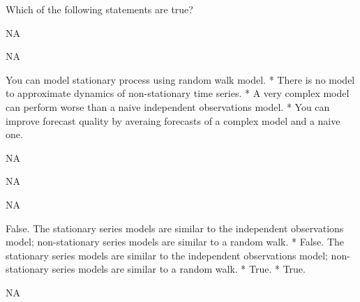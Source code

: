 
\begin{question}
Which of the following statements are true?
\begin{answerlist}
  \item NA
  \item NA
  \item You can model stationary process using random walk model. * There is no model to approximate dynamics of non-stationary time series. * A very complex model can perform worse than a naive independent observations model. * You can improve forecast quality by averaing forecasts of a complex model and a naive one.
  \item NA
\end{answerlist}
\end{question}

\begin{solution}
\begin{answerlist}
  \item NA
  \item NA
  \item False. The stationary series models are similar to the independent observations model; non-stationary series models are similar to a random walk. * False. The stationary series models are similar to the independent observations model; non-stationary series models are similar to a random walk. * True. * True.
  \item NA
\end{answerlist}
\end{solution}


